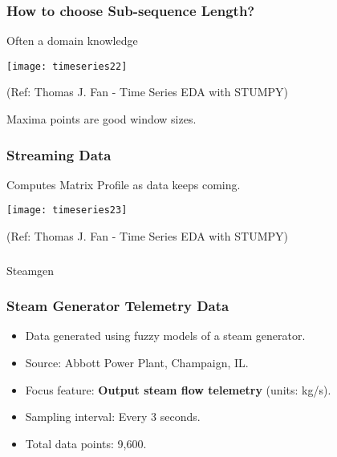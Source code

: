 \begin{frame}[fragile]\frametitle{How to choose Sub-sequence Length?}

Often a domain knowledge

\begin{center}
\texttt{[image: timeseries22]}


{\tiny (Ref: Thomas J. Fan - Time Series EDA with STUMPY)}		
\end{center}

Maxima points are good window sizes.

\end{frame}

\begin{frame}[fragile]\frametitle{Streaming Data}

Computes Matrix Profile as data keeps coming.

\begin{center}
\texttt{[image: timeseries23]}


{\tiny (Ref: Thomas J. Fan - Time Series EDA with STUMPY)}		
\end{center}

\end{frame}


\begin{frame}[fragile]\frametitle{}
\begin{center}
{\Large Steamgen}
\end{center}
\end{frame}

\begin{frame}[fragile]\frametitle{Steam Generator Telemetry Data}
    \begin{itemize}
        \item Data generated using fuzzy models of a steam generator.
        \item Source: Abbott Power Plant, Champaign, IL.
        \item Focus feature: \textbf{Output steam flow telemetry} (units: kg/s).
        \item Sampling interval: Every 3 seconds.
        \item Total data points: 9,600.
    \end{itemize}
\end{frame}



